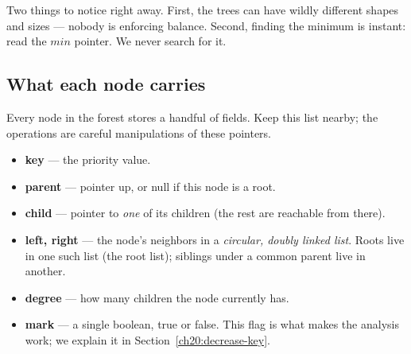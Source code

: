 \begin{center}
\end{center}

Two things to notice right away. First, the trees can have wildly different shapes
and sizes --- nobody is enforcing balance. Second, finding the minimum is instant:
read the $\mathit{min}$ pointer. We never search for it.

\subsection{What each node carries}

Every node in the forest stores a handful of fields. Keep this list nearby; the
operations are careful manipulations of these pointers.

\begin{itemize}
  \item \textbf{key} --- the priority value.
  \item \textbf{parent} --- pointer up, or null if this node is a root.
  \item \textbf{child} --- pointer to \emph{one} of its children (the rest are
        reachable from there).
  \item \textbf{left, right} --- the node's neighbors in a \emph{circular,
        doubly linked list}. Roots live in one such list (the root list);
        siblings under a common parent live in another.
  \item \textbf{degree} --- how many children the node currently has.
  \item \textbf{mark} --- a single boolean, true or false. This flag is
        what makes the analysis work; we explain it in
        Section~\ref{ch20:decrease-key}.
\end{itemize}

